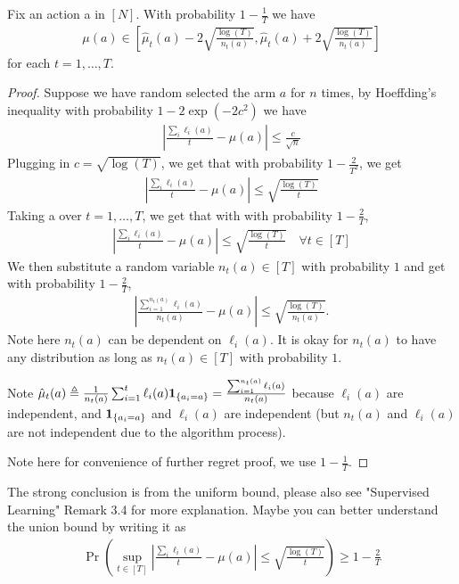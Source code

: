 \documentclass{article}
\begin{document}
\begin{lema}
  Fix an action a in $[N]$. With probability $1-\frac{1}{T}$ we have
\begin{align*}
\mu(a) \in\left[\hat{\mu}_{t}(a)-2\sqrt{\frac{\log (T)}{n_{t}(a)}}, \hat{\mu}_{t}(a)+2\sqrt{\frac{\log (T)}{n_{t}(a)}}\right]
\end{align*}
for each $t=1, \ldots, T.$
\end{lema}
\begin{proof}
Suppose we have random selected the arm $a$ for $n$ times,  by Hoeffding's inequality with probability $1-2 \exp \left(-2 c^{2}\right)$ we have
\begin{align*}
\left|\frac{\sum_i \ell_i(a)}{t}-\mu(a)\right| \leq \frac{c}{\sqrt{n}}
\end{align*}
Plugging in $c=\sqrt{\log (T)}$, we get that with probability $1-\frac{2}{T^{2}}$, we get
\begin{align*}
\left|\frac{\sum_i \ell_i(a)}{t}-\mu(a)\right| \leq \sqrt{\frac{\log (T)}{t}}
\end{align*}
Taking a  over $t=1, \ldots, T$, we get that with  with probability $1-\frac{2}{T}$,
\begin{align*}
\left|\frac{\sum_i \ell_i(a)}{t}-\mu(a)\right| \leq \sqrt{\frac{\log (T)}{t}} \quad \forall t\in [T]
\end{align*}
We then substitute a random variable $n_t(a)\in [T]$ with probability $1$ and get with probability $1-\frac{2}{T}$,
\begin{align*}
\left|\frac{\sum_{i=1}^{n_t(a)} \ell_i(a)}{n_t(a)}-\mu(a)\right| \leq \sqrt{\frac{\log (T)}{n_t(a)}}.
\end{align*}
Note here $n_t(a)$ can be dependent on $\ell_i(a)$. It is okay for $n_t(a)$ to have any distribution as long as $n_t(a)\in [T]$ with probability $1$.

Note $\hat{\mu}_{t}(a) \triangleq \frac{1}{n_{t}(a)} \sum_{i=1}^{t} \ell_{i}(a) {\bf 1}_{\left\{a_{i}=a\right\}}= \frac{\sum_{i=1}^{n_t(a)} \ell_i(a)}{n_t(a)}$ because $\ell_{i}(a)$ are independent, and  ${\bf 1}_{\left\{a_{i}=a\right\}}$ and $\ell_{i}(a)$ are independent (but $n_{t}(a)$ and  $\ell_{i}(a)$ are not independent due to the algorithm process).

Note here for convenience of further regret proof, we use $1-\frac{1}{T}$.
\end{proof}
\begin{rema}
The strong conclusion is from the uniform bound, please also see "Supervised Learning" Remark 3.4 for more explanation. Maybe you can better understand the union bound by writing it as
\begin{align*}
\operatorname{Pr}\left(\sup_{t\in [T]} \left|\frac{\sum_i \ell_i(a)}{t}-\mu(a)\right| \leq \sqrt{\frac{\log (T)}{t}}\right) \ge 1-\frac{2}{T}
\end{align*} 
\end{rema}
\end{document}
